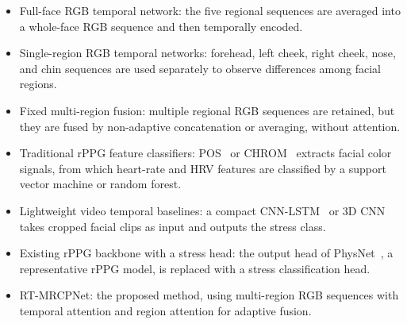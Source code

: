 \documentclass[runningheads]{llncs}
\begin{document}
\begin{itemize}
    \item Full-face RGB temporal network: the five regional sequences are averaged into a whole-face RGB sequence and then temporally encoded.
    \item Single-region RGB temporal networks: forehead, left cheek, right cheek, nose, and chin sequences are used separately to observe differences among facial regions.
    \item Fixed multi-region fusion: multiple regional RGB sequences are retained, but they are fused by non-adaptive concatenation or averaging, without attention.
    \item Traditional rPPG feature classifiers: POS~\cite{wang2017pos} or CHROM~\cite{dehaan2013chrom} extracts facial color signals, from which heart-rate and HRV features are classified by a support vector machine or random forest.
    \item Lightweight video temporal baselines: a compact CNN-LSTM~\cite{ziaratnia2024cctlstm} or 3D CNN~\cite{tran2015c3d} takes cropped facial clips as input and outputs the stress class.
    \item Existing rPPG backbone with a stress head: the output head of PhysNet~\cite{yu2019physnet}, a representative rPPG model, is replaced with a stress classification head.
    \item RT-MRCPNet: the proposed method, using multi-region RGB sequences with temporal attention and region attention for adaptive fusion.
\end{itemize}
\end{document}

